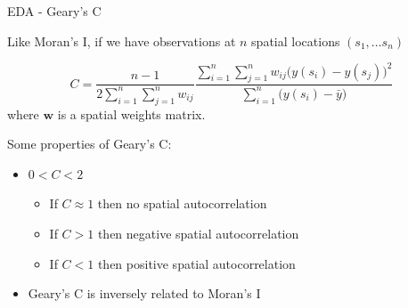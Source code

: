 \documentclass[11pt,ignorenonframetext,]{beamer}
\providecommand{\tightlist}{%
  \setlength{\itemsep}{0pt}\setlength{\parskip}{0pt}}
\begin{document}
\begin{frame}[t]{EDA - Geary’s C}
\protect\hypertarget{eda---gearys-c}{}

Like Moran’s I, if we have observations at \(n\) spatial locations
\((s_1, \ldots s_n)\)

\[ C = \frac{n-1}{2\sum_{i=1}^n \sum_{j=1}^n w_{ij}} \frac{\sum_{i=1}^n \sum_{j=1}^n w_{ij} \big(y(s_i)-y(s_j)\big)^2}{\sum_{i=1}^n \big(y(s_i) - \bar{y}\big)} \]
where \(\symbf{w}\) is a spatial weights matrix.

\pause

\vspace{7mm}

Some properties of Geary’s C:

\begin{itemize}
\tightlist
\item
  \(0 < C < 2\)

  \begin{itemize}
  \tightlist
  \item
    If \(C \approx 1\) then no spatial autocorrelation
  \item
    If \(C > 1\) then negative spatial autocorrelation
  \item
    If \(C < 1\) then positive spatial autocorrelation
  \end{itemize}
\item
  Geary’s C is inversely related to Moran’s I
\end{itemize}

\end{frame}
\end{document}
